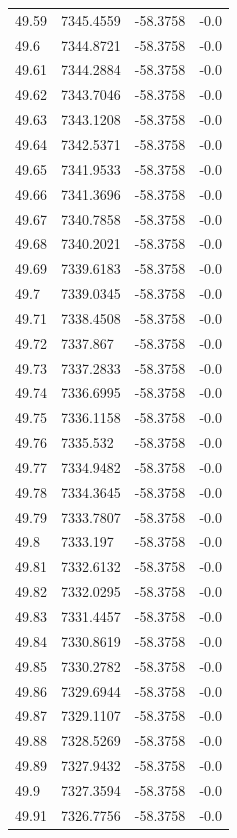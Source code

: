 \begin{table}[H]
\begin{tabular}{llll}
49.59 & 7345.4559 & -58.3758 & -0.0 \\
49.6 & 7344.8721 & -58.3758 & -0.0 \\
49.61 & 7344.2884 & -58.3758 & -0.0 \\
49.62 & 7343.7046 & -58.3758 & -0.0 \\
49.63 & 7343.1208 & -58.3758 & -0.0 \\
49.64 & 7342.5371 & -58.3758 & -0.0 \\
49.65 & 7341.9533 & -58.3758 & -0.0 \\
49.66 & 7341.3696 & -58.3758 & -0.0 \\
49.67 & 7340.7858 & -58.3758 & -0.0 \\
49.68 & 7340.2021 & -58.3758 & -0.0 \\
49.69 & 7339.6183 & -58.3758 & -0.0 \\
49.7 & 7339.0345 & -58.3758 & -0.0 \\
49.71 & 7338.4508 & -58.3758 & -0.0 \\
49.72 & 7337.867 & -58.3758 & -0.0 \\
49.73 & 7337.2833 & -58.3758 & -0.0 \\
49.74 & 7336.6995 & -58.3758 & -0.0 \\
49.75 & 7336.1158 & -58.3758 & -0.0 \\
49.76 & 7335.532 & -58.3758 & -0.0 \\
49.77 & 7334.9482 & -58.3758 & -0.0 \\
49.78 & 7334.3645 & -58.3758 & -0.0 \\
49.79 & 7333.7807 & -58.3758 & -0.0 \\
49.8 & 7333.197 & -58.3758 & -0.0 \\
49.81 & 7332.6132 & -58.3758 & -0.0 \\
49.82 & 7332.0295 & -58.3758 & -0.0 \\
49.83 & 7331.4457 & -58.3758 & -0.0 \\
49.84 & 7330.8619 & -58.3758 & -0.0 \\
49.85 & 7330.2782 & -58.3758 & -0.0 \\
49.86 & 7329.6944 & -58.3758 & -0.0 \\
49.87 & 7329.1107 & -58.3758 & -0.0 \\
49.88 & 7328.5269 & -58.3758 & -0.0 \\
49.89 & 7327.9432 & -58.3758 & -0.0 \\
49.9 & 7327.3594 & -58.3758 & -0.0 \\
49.91 & 7326.7756 & -58.3758 & -0.0 \\

\end{tabular}
\end{table}
